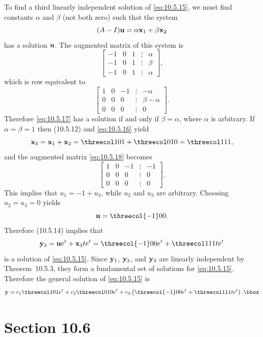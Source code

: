 \begin{examplesolution}
To find a third linearly independent solution of \eqref{eq:10.5.15}, we must find constants $\alpha$
and $\beta$ (not both zero) such that the system
\begin{equation}
  \label{eq:10.5.17}(A-I){\bf u}=\alpha{\bf x}_{1}+\beta{\bf x}_{2}
\end{equation}
has a solution ${\bf u}$. The augmented matrix of this system is
\[
  \left[
  \begin{array}{rrrcr}
    -1 & 0 & 1 & \vdots & \alpha \\
    -1 & 0 & 1 & \vdots & \beta  \\
    -1 & 0 & 1 & \vdots & \alpha
  \end{array}\right],
\]
which is row equivalent to
\begin{equation}
  \label{eq:10.5.18}\left[
  \begin{array}{rrrcr}
    1 & 0 & -1 & \vdots & -\alpha      \\
    0 & 0 & 0  & \vdots & \beta-\alpha \\
    0 & 0 & 0  & \vdots & 0
  \end{array}
  \right].
\end{equation}
Therefore \eqref{eq:10.5.17} has a solution if and only if $\beta=\alpha$, where $\alpha$ is
arbitrary. If $\alpha=\beta=1$ then \textup{(10.5.12)} and \eqref{eq:10.5.16} yield
\[
  {\bf x}_{3}={\bf x}_{1}+{\bf x}_{2}= \threecol101+\threecol010=\threecol111,
\]
and the augmented matrix \eqref{eq:10.5.18} becomes
\[
  \left[
  \begin{array}{rrrcr}
    1 & 0 & -1 & \vdots & -1 \\
    0 & 0 & 0  & \vdots & 0  \\
    0 & 0 & 0  & \vdots & 0
  \end{array}
  \right].
\]
This implies that $u_{1}=-1+u_{3}$, while $u_{2}$ and $u_{3}$ are arbitrary. Choosing
$u_{2}=u_{3}=0$ yields
\[
  {\bf u}=\threecol{-1}00.
\]
Therefore \textup{(10.5.14)} implies that
\[
  {\bf y}_{3}={\bf u}e^{t}+{\bf x}_{3}te^{t}=\threecol{-1}00e^{t}+\threecol111te^{t}
\]
is a solution of \eqref{eq:10.5.15}. Since ${\bf y}_{1}$, ${\bf y}_{2}$, and ${\bf y}_{3}$ are
linearly independent by Theorem~10.5.3, they form a fundamental set of solutions for
\eqref{eq:10.5.15}. Therefore the general solution of \eqref{eq:10.5.15} is
\[
  {\bf y}=c_{1}\threecol101e^{t}+c_{2}\threecol010e^{t}+c_{3}\left(\threecol{-1}00e^{t}+\threecol111te^{t}\right).\bbox
\]
\end{examplesolution}

\section*{Section 10.6}
\setcounter{chapter}{10}
\setcounter{section}{6}

